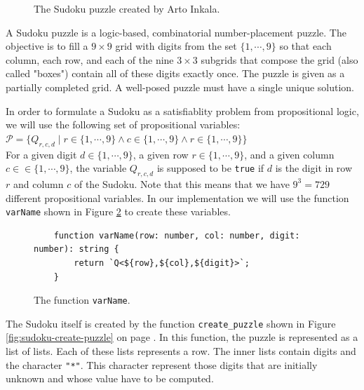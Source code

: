 \begin{figure}[!ht]
  \centering
  \caption{The Sudoku puzzle created by Arto Inkala.}
  \label{fig:sudoku.png}
\end{figure}

A Sudoku puzzle is a logic-based, combinatorial number-placement puzzle. The objective is to fill a
$9 \times 9$ grid with digits from the set $\{1, \cdots, 9\}$ so that each column, each row, and each of the
nine $3 \times 3$ subgrids that compose the grid (also called "boxes") contain all of these digits exactly
once.  The puzzle is given as a partially completed grid.  A well-posed puzzle must have a single unique
solution.

In order to formulate a Sudoku as a satisfiablity problem from propositional logic, we will use the following
set of propositional variables:
\\[0.2cm]
\hspace*{1.3cm}
$\mathcal{P} = \bigl\{ Q_{r,c,d} \mid r \in \{1,\cdots, 9\} \wedge c \in \{1,\cdots, 9\} \wedge r \in \{1,\cdots, 9\} \bigl\}$
\\[0.2cm]
For a given digit $d \in \{1, \cdots, 9\}$, a given row $r \in \{1, \cdots, 9\}$, and a given column
$c \in \in \{1, \cdots, 9\}$, the variable $Q_{r,c,d}$ is supposed to be \texttt{true} if $d$ is the digit in
row $r$ and column $c$ of the Sudoku.  Note that this means that we have $9^3 = 729$ different propositional
variables.  In our implementation we will use the function \texttt{varName} shown in
Figure \ref{fig:sudoku-var} to create these variables.

\begin{figure}[!ht]
\centering
\begin{verbatim}
    function varName(row: number, col: number, digit: number): string {
        return `Q<${row},${col},${digit}>`;
    }
\end{verbatim}
\vspace*{-0.3cm}
\caption{The function \texttt{varName}.}
\label{fig:sudoku-var}
\end{figure} %

The Sudoku itself is created by the function \texttt{create\_puzzle} shown in Figure
\ref{fig:sudoku-create-puzzle} on page \pageref{fig:sudoku-create-puzzle}.  In this function, the puzzle is
represented as a list of lists.  Each of these lists represents a row.  The inner lists contain digits and the
character \texttt{"*"}.  This character represent those digits that are initially unknown and whose value have
to be computed.

